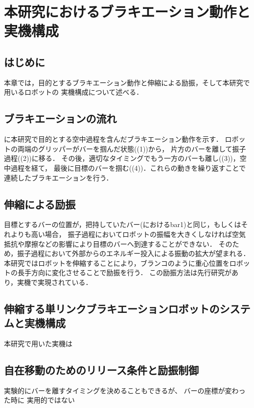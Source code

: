 \chapter[本研究におけるブラキエーション動作と実機構成]%
        {本研究におけるブラキエーション動作と実機構成}
        \section{はじめに}
          
          本章では，目的とするブラキエーション動作と伸縮による励振，そして本研究で用いるロボットの
          実機構成について述べる．


        \section{ブラキエーションの流れ}

          に本研究で目的とする空中過程を含んだブラキエーション動作を示す．
          ロボットの両端のグリッパーがバーを掴んだ状態((1))から，
          片方のバーを離して振子過程((2))に移る．
          その後，適切なタイミングでもう一方のバーも離し((3))，空中過程を経て，
          最後に目標のバーを掴む((4))．これらの動きを繰り返すことで連続したブラキエーションを行う．

        \section{伸縮による励振}
          
          目標とするバーの位置が，把持していたバー(におけるbar1)と同じ，もしくはそれよりも高い場合，
          振子過程においてロボットの振幅を大きくしなければ空気抵抗や摩擦などの影響により目標のバーへ到達することができない．
          そのため，振子過程において外部からのエネルギー投入による振動の拡大が望まれる．
          本研究ではロボットを伸縮することにより，ブランコのように重心位置をロボットの長手方向に変化させることで励振を行う．
          この励振方法は先行研究があり，実機で実現されている\cite{Hijiri:Robomech2024}．
          
        
        \section{伸縮する単リンクブラキエーションロボットのシステムと実機構成}
          
          本研究で用いた実機は\cite{Hijiri:Robomech2024}


        
        
        \section{}
        \section{自在移動のためのリリース条件と励振制御}
        
          実験的にバーを離すタイミングを決めることもできるが、
          バーの座標が変わった時に
          実用的ではない
